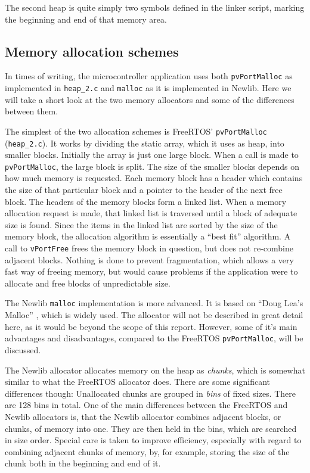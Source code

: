 The second heap is quite simply two symbols defined in the linker script, marking the beginning and end of that memory area.


\subsection{Memory allocation schemes}
In times of writing, the microcontroller application uses both \texttt{pvPortMalloc} as implemented in \texttt{heap\_2.c} and \texttt{malloc} as it is implemented in Newlib. Here we will take a short look at the two memory allocators and some of the differences between them.

The simplest of the two allocation schemes is FreeRTOS' \texttt{pvPortMalloc} (\texttt{heap\_2.c}). It works by dividing the static array, which it uses as heap, into smaller blocks. Initially the array is just one large block. When a call is made to \texttt{pvPortMalloc}, the large block is split. The size of the smaller blocks depends on how much memory is requested. Each memory block has a header which contains the size of that particular block and a pointer to the header of the next free block. The headers of the memory blocks form a linked list. When a memory allocation request is made, that linked list is traversed until a block of adequate size is found. Since the items in the linked list are sorted by the size of the memory block, the allocation algorithm is essentially a ``best fit'' algorithm. A call to \texttt{vPortFree} frees the memory block in question, but does not re-combine adjacent blocks. Nothing is done to prevent fragmentation, which allows a very fast way of freeing memory, but would cause problems if the application were to allocate and free blocks of unpredictable size.

The Newlib \texttt{malloc} implementation is more advanced. It is based on ``Doug Lea's Malloc'' \cite{dlmalloc}, which is widely used. The allocator will not be described in great detail here, as it would be beyond the scope of this report. However, some of it's main advantages and disadvantages, compared to the FreeRTOS \texttt{pvPortMalloc}, will be discussed.

The Newlib allocator allocates memory on the heap as \textit{chunks}, which is somewhat similar to what the FreeRTOS allocator does. There are some significant differences though: Unallocated chunks are grouped in \textit{bins} of fixed sizes. There are 128 bins in total. One of the main differences between the FreeRTOS and Newlib allocators is, that the Newlib allocator combines adjacent blocks, or chunks, of memory into one. They are then held in the bins, which are searched in size order. Special care is taken to improve efficiency, especially with regard to combining adjacent chunks of memory, by, for example, storing the size of the chunk both in the beginning and end of it.

